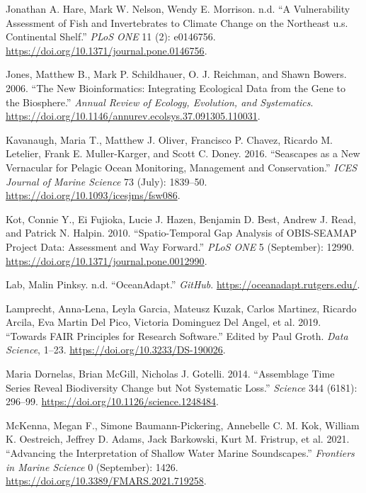 \documentclass[
]{book}
\newlength{\cslhangindent}
\newlength{\cslentryspacingunit} %
\newenvironment{CSLReferences}[2] %
 {%
  \setlength{\parindent}{0pt}
  \ifodd #1
  \let\oldpar\par
  \def\par{\hangindent=\cslhangindent\oldpar}
  \fi
  \setlength{\parskip}{#2\cslentryspacingunit}
 }%
 {}
\begin{document}
\begin{CSLReferences}{1}{0}
\leavevmode{}%
Jonathan A. Hare, Mark W. Nelson, Wendy E. Morrison. n.d. {``A Vulnerability Assessment of Fish and Invertebrates to Climate Change on the Northeast u.s. Continental Shelf.''} \emph{PLoS ONE} 11 (2): e0146756. \url{https://doi.org/10.1371/journal.pone.0146756}.

\leavevmode{}%
Jones, Matthew B., Mark P. Schildhauer, O. J. Reichman, and Shawn Bowers. 2006. {``The New Bioinformatics: Integrating Ecological Data from the Gene to the Biosphere.''} \emph{Annual Review of Ecology, Evolution, and Systematics}. \url{https://doi.org/10.1146/annurev.ecolsys.37.091305.110031}.

\leavevmode{}%
Kavanaugh, Maria T., Matthew J. Oliver, Francisco P. Chavez, Ricardo M. Letelier, Frank E. Muller-Karger, and Scott C. Doney. 2016. {``Seascapes as a New Vernacular for Pelagic Ocean Monitoring, Management and Conservation.''} \emph{ICES Journal of Marine Science} 73 (July): 1839--50. \url{https://doi.org/10.1093/icesjms/fsw086}.

\leavevmode{}%
Kot, Connie Y., Ei Fujioka, Lucie J. Hazen, Benjamin D. Best, Andrew J. Read, and Patrick N. Halpin. 2010. {``Spatio-Temporal Gap Analysis of OBIS-SEAMAP Project Data: Assessment and Way Forward.''} \emph{PLoS ONE} 5 (September): 12990. \url{https://doi.org/10.1371/journal.pone.0012990}.

\leavevmode{}%
Lab, Malin Pinksy. n.d. {``OceanAdapt.''} \emph{GitHub}. \url{https://oceanadapt.rutgers.edu/}.

\leavevmode{}%
Lamprecht, Anna-Lena, Leyla Garcia, Mateusz Kuzak, Carlos Martinez, Ricardo Arcila, Eva Martin Del Pico, Victoria Dominguez Del Angel, et al. 2019. {``Towards FAIR Principles for Research Software.''} Edited by Paul Groth. \emph{Data Science}, 1--23. \url{https://doi.org/10.3233/DS-190026}.

\leavevmode{}%
Maria Dornelas, Brian McGill, Nicholas J. Gotelli. 2014. {``Assemblage Time Series Reveal Biodiversity Change but Not Systematic Loss.''} \emph{Science} 344 (6181): 296--99. \url{https://doi.org/10.1126/science.1248484}.

\leavevmode{}%
McKenna, Megan F., Simone Baumann-Pickering, Annebelle C. M. Kok, William K. Oestreich, Jeffrey D. Adams, Jack Barkowski, Kurt M. Fristrup, et al. 2021. {``Advancing the Interpretation of Shallow Water Marine Soundscapes.''} \emph{Frontiers in Marine Science} 0 (September): 1426. \url{https://doi.org/10.3389/FMARS.2021.719258}.


\end{CSLReferences}
\end{document}

